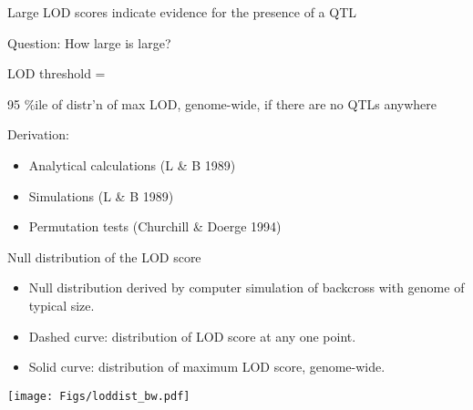 \documentclass[12pt]{article}
\newcommand{\headsize}{\fontsize{35}{35} \selectfont}
\newcommand{\smallersize}{\fontsize{20}{25} \selectfont}
\begin{document}
\hfill
\begin{minipage}{10in}
Large LOD scores indicate evidence for the presence of a QTL
\vspace{5mm}

{\color{mypink} Question}: How large is large?
\vspace{20mm}

{\color{myyellow} LOD threshold} =  \hspace{2mm}
\begin{minipage}[t]{7in}
\setlength{\rightskip}{0pt plus 1fil} %
95 \%ile of distr'n of max LOD, genome-wide, if there are no QTLs anywhere
\end{minipage}
\vspace{20mm}

\hspace{15mm} {\color{myyellow} Derivation:} \hfill
\begin{minipage}[t]{7.5in}
\begin{itemize}
\item Analytical calculations (L \& B 1989)
\item Simulations (L \& B 1989)
\item Permutation tests (Churchill \& Doerge 1994)
\end{itemize} \end{minipage}
\end{minipage}



\newpage

\headsize \color{myyellow}
\hfill \begin{minipage}{5.75in}
\centering
Null distribution of the LOD score
\end{minipage}

\vspace{3cm}

\hspace*{0.5in}
\begin{minipage}[t]{4.7in}
\vspace*{10mm}

\color{mywhite} \smallersize
\begin{itemize}
\setlength{\rightskip}{0pt plus 1fil} %
\item Null distribution derived by computer simulation of backcross
with genome of typical size.
\item Dashed curve: distribution of LOD score at any one point.
\item Solid curve: distribution of maximum LOD score, genome-wide.
\end{itemize}
\end{minipage}
\hfill
\begin{minipage}[t]{4.7in}
\vspace*{0cm}

\texttt{[image: Figs/loddist\_bw.pdf]}
\end{minipage}
\end{document}
